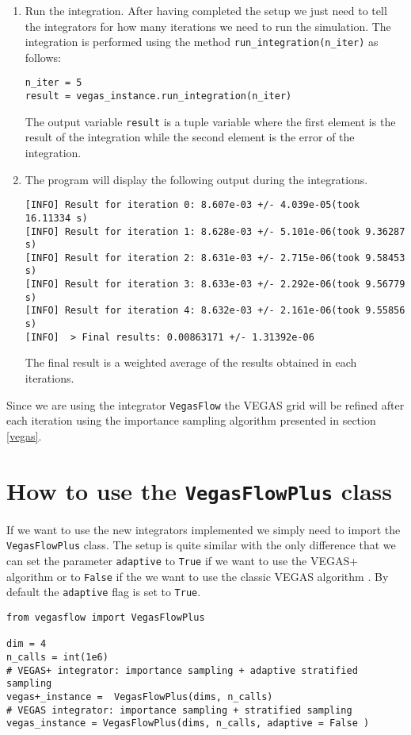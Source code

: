 \documentclass[../main/main.tex]{subfiles}
\begin{document}
\begin{enumerate}
\item Run the integration. After having completed the setup we just need to tell the integrators for how many iterations we need to run the simulation. The integration is performed using the method \texttt{run\_integration(n\_iter)} as follows:
\begin{verbatim}
n_iter = 5
result = vegas_instance.run_integration(n_iter)
\end{verbatim}
The output variable \texttt{result} is a tuple variable where the first element is the result of the integration while the second element is the error of the integration.
\item The program will display the following output during the integrations.
\begin{verbatim}
[INFO] Result for iteration 0: 8.607e-03 +/- 4.039e-05(took 16.11334 s)
[INFO] Result for iteration 1: 8.628e-03 +/- 5.101e-06(took 9.36287 s)
[INFO] Result for iteration 2: 8.631e-03 +/- 2.715e-06(took 9.58453 s)
[INFO] Result for iteration 3: 8.633e-03 +/- 2.292e-06(took 9.56779 s)
[INFO] Result for iteration 4: 8.632e-03 +/- 2.161e-06(took 9.55856 s)
[INFO]  > Final results: 0.00863171 +/- 1.31392e-06
\end{verbatim}
The final result is a weighted average of the results obtained in each iterations.
\end{enumerate}

Since we are using the integrator \texttt{VegasFlow} the VEGAS grid will be refined after each iteration using the importance sampling algorithm presented in section \ref{vegas}.

\section{How to use the \texttt{VegasFlowPlus} class}
If we want to use the new integrators implemented we simply need to import the \texttt{VegasFlowPlus} class. The setup is quite similar with the only difference that we can set the parameter \texttt{adaptive} to \texttt{True} if we want to use the VEGAS+ algorithm \cite{Lepage:2020tgj} or to \texttt{False} if the we want to use the classic VEGAS algorithm \cite{Lepage:1977sw}. By default the \texttt{adaptive} flag is set to \texttt{True}.


\begin{verbatim}
from vegasflow import VegasFlowPlus
		
dim = 4
n_calls = int(1e6)
# VEGAS+ integrator: importance sampling + adaptive stratified sampling
vegas+_instance =  VegasFlowPlus(dims, n_calls)
# VEGAS integrator: importance sampling + stratified sampling
vegas_instance = VegasFlowPlus(dims, n_calls, adaptive = False )
\end{verbatim}
\end{document}
